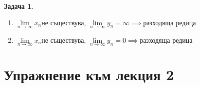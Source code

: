 \documentclass[a4paper,fleqn,12pt]{article}
\theoremstyle{definition}
\newtheorem{task}{Задача}[subsection]
\begin{document}
\begin{task}
\begin{enumerate}
\item $\lim\limits_{n \to \infty} x_n \text{не съществува}, \,  
\lim\limits_{n \to \infty} y_n = \infty \implies \text{разходяща редица}$

\item $\lim\limits_{n \to \infty} x_n \text{не съществува}, \,  
\lim\limits_{n \to \infty} y_n = 0 \implies \text{разходяща редица}$

\end{enumerate}

\end{task}

\newpage
\section{Упражнение към лекция 2}
\end{document}

